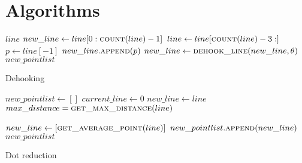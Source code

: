

\appendix

{}	%
{}	%

\section{Algorithms}\label{appendix:algorithms}
\begin{algorithm}[ht]
  \begin{algorithmic}
                \State \Return $line$
            \Else
                \State $new\_line \gets line[0: \Call{count}{line}-1]$ 
                \State $line \gets line[\Call{count}{line}-3:]$ 
                \State $p \gets line[-1]$ 
                    \State $new\_line.\Call{append}{p}$
                \Else
                    \State $new\_line \gets \Call{dehook\_line}{new\_line, \theta}$
                \EndIf
            \EndIf
            \Return $new\_pointlist$
        \EndFunction
  \end{algorithmic}
  \caption{Dehooking}
  \label{alg:dehooking}
\end{algorithm}

\begin{algorithm}[ht]
  \begin{algorithmic}
            \State $new\_pointlist \gets []$
            \State $current\_line \gets 0$
                \State $new\_line \gets line$
                \State $max\_distance = \Call{get\_max\_distance}{line}$

                    \State $new\_line \gets [\Call{get\_average\_point}{line}]$
                \EndIf
                \State $new\_pointlist.\Call{append}{new\_line}$
            \EndFor
            \Return $new\_pointlist$
        \EndFunction
  \end{algorithmic}
  \caption{Dot reduction}
  \label{alg:dot-reduction}
\end{algorithm}


